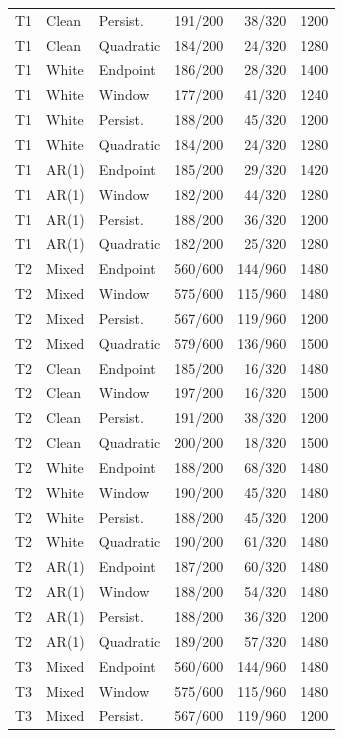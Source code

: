 \documentclass[10pt]{article}
\begin{document}
\begin{longtable}{lllrrr}
T1 & Clean & Persist. & 191/200 & 38/320 & 1200 \\
T1 & Clean & Quadratic & 184/200 & 24/320 & 1280 \\
T1 & White & Endpoint & 186/200 & 28/320 & 1400 \\
T1 & White & Window & 177/200 & 41/320 & 1240 \\
T1 & White & Persist. & 188/200 & 45/320 & 1200 \\
T1 & White & Quadratic & 184/200 & 24/320 & 1280 \\
T1 & AR(1) & Endpoint & 185/200 & 29/320 & 1420 \\
T1 & AR(1) & Window & 182/200 & 44/320 & 1280 \\
T1 & AR(1) & Persist. & 188/200 & 36/320 & 1200 \\
T1 & AR(1) & Quadratic & 182/200 & 25/320 & 1280 \\
T2 & Mixed & Endpoint & 560/600 & 144/960 & 1480 \\
T2 & Mixed & Window & 575/600 & 115/960 & 1480 \\
T2 & Mixed & Persist. & 567/600 & 119/960 & 1200 \\
T2 & Mixed & Quadratic & 579/600 & 136/960 & 1500 \\
T2 & Clean & Endpoint & 185/200 & 16/320 & 1480 \\
T2 & Clean & Window & 197/200 & 16/320 & 1500 \\
T2 & Clean & Persist. & 191/200 & 38/320 & 1200 \\
T2 & Clean & Quadratic & 200/200 & 18/320 & 1500 \\
T2 & White & Endpoint & 188/200 & 68/320 & 1480 \\
T2 & White & Window & 190/200 & 45/320 & 1480 \\
T2 & White & Persist. & 188/200 & 45/320 & 1200 \\
T2 & White & Quadratic & 190/200 & 61/320 & 1480 \\
T2 & AR(1) & Endpoint & 187/200 & 60/320 & 1480 \\
T2 & AR(1) & Window & 188/200 & 54/320 & 1480 \\
T2 & AR(1) & Persist. & 188/200 & 36/320 & 1200 \\
T2 & AR(1) & Quadratic & 189/200 & 57/320 & 1480 \\
T3 & Mixed & Endpoint & 560/600 & 144/960 & 1480 \\
T3 & Mixed & Window & 575/600 & 115/960 & 1480 \\
T3 & Mixed & Persist. & 567/600 & 119/960 & 1200 \\

\end{longtable}
\end{document}
